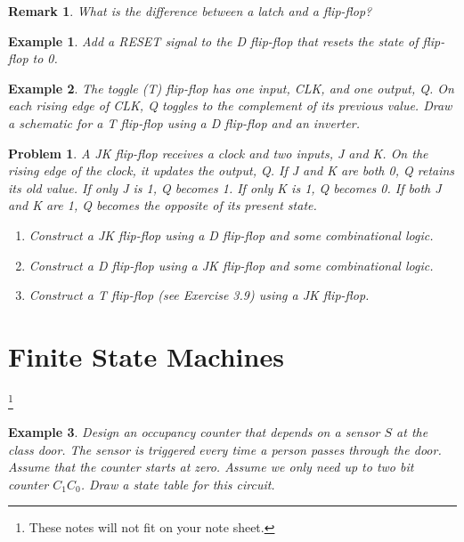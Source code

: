 \documentclass{article}
\newtheorem{example}{Example}
\newtheorem{prob}{Problem}
\newtheorem{remark}{Remark}
\begin{document}
\begin{remark}
  What is the difference between a latch and a flip-flop?
\end{remark}
\vspace{5em}

\begin{example}
  Add a \emph{RESET} signal to the D flip-flop that resets the state of flip-flop to 0.
\end{example}
\vspace{20em}

\begin{example}
  The toggle (T) flip-flop has one input, CLK, and one output, Q. On
  each rising edge of CLK, Q toggles to the complement of its previous value. Draw
  a schematic for a T flip-flop using a D flip-flop and an inverter.
\end{example}
\vspace{20em}

\begin{prob}
  A JK flip-flop receives a clock and two inputs, J and K. On the rising
  edge of the clock, it updates the output, Q. If J and K are both 0, Q retains its old
  value. If only J is 1, Q becomes 1. If only K is 1, Q becomes 0. If both J and K are 1,
  Q becomes the opposite of its present state.
  \begin{enumerate}
  \item Construct a JK flip-flop using a D flip-flop and some combinational logic.
  \item Construct a D flip-flop using a JK flip-flop and some combinational logic.
  \item Construct a T flip-flop (see Exercise 3.9) using a JK flip-flop.
  \end{enumerate}
\end{prob}


\section{Finite State Machines~\cite[Sec~3.4]{harris2022digital}}\footnote{These
  notes will not fit on your note sheet.}

\begin{example}
  Design an occupancy counter that depends on a
  sensor $S$ at the class door. The sensor is triggered every time a person passes
  through the door. Assume that the counter starts at zero. Assume
  we only need up to two bit counter $C_1C_0$. Draw a state table for this
  circuit.
\end{example}
\end{document}
